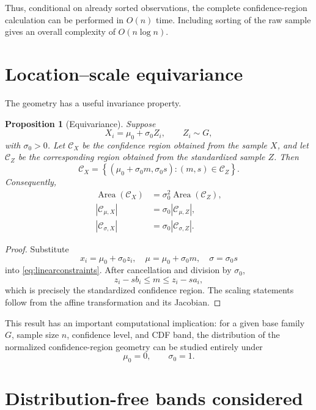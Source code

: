 \documentclass[11pt]{article}
\newtheorem{proposition}{Proposition}
\newcommand{\cC}{\mathcal{C}}
\begin{document}
Thus, conditional on already sorted observations, the complete
confidence-region calculation can be performed in $O(n)$ time.
Including sorting of the raw sample gives an overall complexity of
$O(n\log n)$.


\section{Location--scale equivariance}

The geometry has a useful invariance property.

\begin{proposition}[Equivariance]
\label{prop:equivariance}
Suppose
\[
    X_i=\mu_0+\sigma_0 Z_i,
    \qquad
    Z_i\sim G,
\]
with $\sigma_0>0$.  Let $\cC_X$ be the confidence region obtained from
the sample $X$, and let $\cC_Z$ be the corresponding region obtained
from the standardized sample $Z$.  Then
\begin{equation}
    \cC_X
    =
    \left\{
        (\mu_0+\sigma_0 m,\sigma_0 s):
        (m,s)\in\cC_Z
    \right\}.
    \label{eq:equivariance}
\end{equation}
Consequently,
\begin{align}
    \operatorname{Area}(\cC_X)
    &=
    \sigma_0^2
    \operatorname{Area}(\cC_Z),
    \\
    |\cC_{\mu,X}|
    &=
    \sigma_0
    |\cC_{\mu,Z}|,
    \\
    |\cC_{\sigma,X}|
    &=
    \sigma_0
    |\cC_{\sigma,Z}|.
\end{align}
\end{proposition}

\begin{proof}
Substitute
\[
    x_i=\mu_0+\sigma_0z_i,
    \quad
    \mu=\mu_0+\sigma_0m,
    \quad
    \sigma=\sigma_0s
\]
into \eqref{eq:linearconstraints}.  After cancellation and division by
$\sigma_0$,
\[
    z_i-sb_i
    \leq
    m
    \leq
    z_i-sa_i,
\]
which is precisely the standardized confidence region.
The scaling statements follow from the affine transformation and its
Jacobian.
\end{proof}

This result has an important computational implication: for a given
base family $G$, sample size $n$, confidence level, and CDF band, the
distribution of the normalized confidence-region geometry can be
studied entirely under
\[
    \mu_0=0,
    \qquad
    \sigma_0=1.
\]


\section{Distribution-free bands considered}
\end{document}
